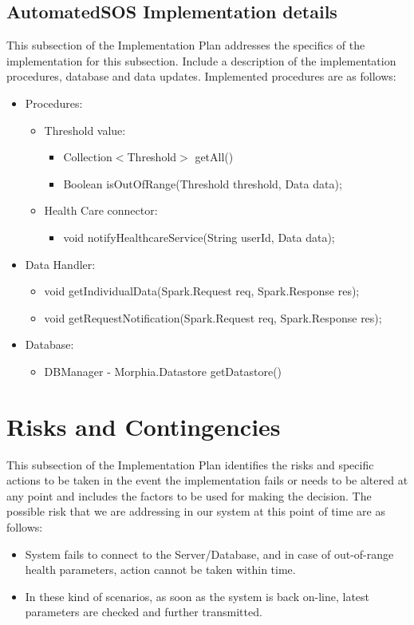 \documentclass[a4paper, hidelinks, 12pt]{report}
\begin{document}
\subsection{AutomatedSOS Implementation details}
This subsection of the Implementation Plan addresses the specifics of the implementation for this subsection. Include a description of the implementation procedures, database and data updates. Implemented procedures are as follows:
\begin{itemize}
\item{} Procedures:
\begin{itemize}
\item{} Threshold value:
\begin{itemize}
\item{} Collection$<$Threshold$>$ getAll()
\item{} Boolean isOutOfRange(Threshold threshold, Data data);
\end{itemize}
\item{} Health Care connector:
\begin{itemize}
\item{} void notifyHealthcareService(String userId, Data data);
\end{itemize}
\end{itemize}

\item{} Data Handler:
\begin{itemize}
\item{} void getIndividualData(Spark.Request req, Spark.Response res);
\item{} void getRequestNotification(Spark.Request req, Spark.Response res);
\end{itemize}

\item{} Database:
\begin{itemize}
\item{} DBManager - Morphia.Datastore getDatastore()
\end{itemize}
\end{itemize}	

\section{Risks and Contingencies}
This subsection of the Implementation Plan identifies the risks and specific actions to be taken in the event the implementation fails or needs to be altered at any point and includes the factors to be used for making the decision. The possible risk that we are addressing in our system at this point of time are as follows:
\begin{itemize}
\item{} System fails to connect to the Server/Database, and in case of out-of-range health parameters, action cannot be taken within time. 
\item{} In these kind of scenarios, as soon as the system is back on-line, latest parameters are checked and further transmitted.
\end{itemize}
\end{document}

